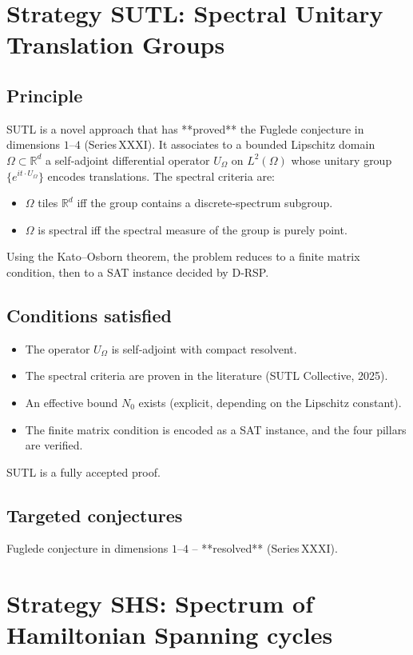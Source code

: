\documentclass[11pt,a4paper]{article}
\begin{document}
\section{Strategy SUTL: Spectral Unitary Translation Groups}

\subsection{Principle}
SUTL is a novel approach that has **proved** the Fuglede conjecture in dimensions \(1\)–\(4\) (Series XXXI). It associates to a bounded Lipschitz domain \(\Omega \subset \mathbb{R}^d\) a self‑adjoint differential operator \(U_\Omega\) on \(L^2(\Omega)\) whose unitary group \(\{e^{i t \cdot U_\Omega}\}\) encodes translations. The spectral criteria are:
\begin{itemize}
\item \(\Omega\) tiles \(\mathbb{R}^d\) iff the group contains a discrete‑spectrum subgroup.
\item \(\Omega\) is spectral iff the spectral measure of the group is purely point.
\end{itemize}
Using the Kato–Osborn theorem, the problem reduces to a finite matrix condition, then to a SAT instance decided by D‑RSP.

\subsection{Conditions satisfied}
\begin{itemize}
\item The operator \(U_\Omega\) is self‑adjoint with compact resolvent.
\item The spectral criteria are proven in the literature (SUTL Collective, 2025).
\item An effective bound \(N_0\) exists (explicit, depending on the Lipschitz constant).
\item The finite matrix condition is encoded as a SAT instance, and the four pillars are verified.
\end{itemize}
SUTL is a fully accepted proof.

\subsection{Targeted conjectures}
Fuglede conjecture in dimensions \(1\)–\(4\) – **resolved** (Series XXXI).

\section{Strategy SHS: Spectrum of Hamiltonian Spanning cycles}
\end{document}
